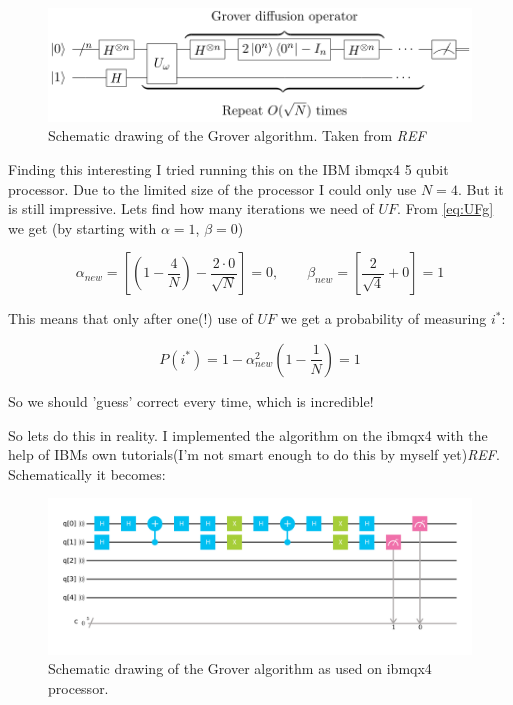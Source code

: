 \documentclass[a4paper,norsk, 10pt]{article}
\begin{document}
\begin{figure}[H]
\centering
\includegraphics[scale=0.5]{grover.png}
\caption{Schematic drawing of the Grover algorithm. Taken from \emph{REF}}
\end{figure}

Finding this interesting I tried running this on the IBM ibmqx4 5 qubit processor. Due to the limited size of the processor I could only use $N=4$. But it is still impressive. Lets find how many iterations we need of $UF$. From \eqref{eq:UFg} we get (by starting with $\alpha = 1$, $\beta = 0$)

\begin{equation}
\alpha_{new} = \left[\left(1 - \frac{4}{N}\right) - \frac{2\cdot 0}{\sqrt{N}}\right] = 0, \qquad \beta_{new} = \left[\frac{2}{\sqrt{4}} + 0\right] = 1
\end{equation}

This means that only after one(!) use of $UF$ we get a probability of measuring $i^*$:

\begin{equation}
P(i^*) = 1 - \alpha^2_{new}\left(1 - \frac{1}{N}\right) = 1
\end{equation}

So we should 'guess' correct every time, which is incredible!

So lets do this in reality. I implemented the algorithm on the ibmqx4 with the help of IBMs own tutorials(I'm not smart enough to do this by myself yet)\emph{REF}. Schematically it becomes:

\begin{figure}[H]
\centering
\includegraphics[scale=0.2]{groverIBM.png}
\caption{Schematic drawing of the Grover algorithm as used on ibmqx4 processor.}
\end{figure}
\end{document}
